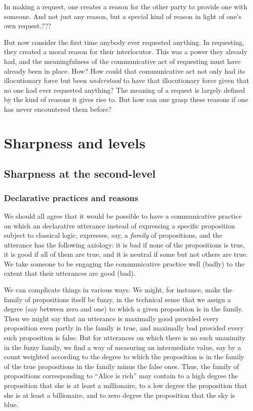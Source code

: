 In making a request, one creates a reason for the other party to provide one with someone. And not just any reason, but a special
kind of reason in light of one's own request.???

But now consider the first time anybody ever requested anything. In requesting, they created a moral reason for their interlocutor. 
This was a power they already had, and the meaningfulness of the communicative act of requesting must have already been in place. 
How? How could that communicative act not only had its illocutionary force but been \textit{understood} to have that illocutionary 
force given that no one had ever requested anything? The meaning of a request is largely defined by the kind of reasons it gives
rise to. But how can one grasp these reasons if one has never encountered them before?

\section{Sharpness and levels}
\subsection{Sharpness at the second-level}\label{sec:limiting}
\subsubsection{Declarative practices and reasons}
We should all agree that it would be possible to have a communicative practice on which an declarative utterance instead of expressing 
a specific proposition subject to classical logic, expresses, say, a \textit{family} of propositions, and the utterance has the following
axiology: it is bad if none of the propositions is true, it is good if all of them are true, and it is neutral if some but not others are
true. We take someone to be engaging the communicative practice well (badly) to the extent that their utterances are good (bad).

We can complicate things in various ways. We might, for instance, make the family of propositions itself be fuzzy, in the technical sense that we assign
a degree (say between zero and one) to which a given proposition is in the family. Then we might say that an utterance is maximally good provided every proposition
even partly in the family is true, and maximally bad provided every such proposition is false. But for utterances on which there is no
such unanimity in the fuzzy family, we find a way of measuring an intermediate value, say by a count weighted according to the degree 
to which the proposition is in the family of the true propositions in the family minus the false ones. Thus, the family of propositions
corresponding to ``Alice is rich'' may contain to a high degree the proposition that she is at least a millionaire, to a low degree 
the proposition that she is at least a billionaire, and to zero degree the proposition that the sky is blue. 

